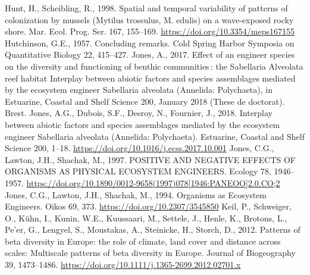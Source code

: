 \documentclass[12pt]{report}
\begin{document}
\begin{singlespacing}
\newline\newline
Hunt, H., Scheibling, R., 1998. Spatial and temporal variability of patterns of colonization by mussels (Mytilus trossulus, M. edulis) on a wave-exposed rocky shore. Mar. Ecol. Prog. Ser. 167, 155–169. \href{https://doi.org/10.3354/meps167155}{https://doi.org/10.3354/meps167155}
\newline\newline
Hutchinson, G.E., 1957. Concluding remarks. Cold Spring Harbor Symposia on Quantitative Biology 22, 415–427.
\newline\newline
Jones, A., 2017. Effect of an engineer species on the diversity and functioning of benthic communities : the Sabellaria Alveolata reef habitat Interplay between abiotic factors and species assemblages mediated by the ecosystem engineer Sabellaria alveolata (Annelida: Polychaeta), in Estuarine, Coastal and Shelf Science 200, January 2018 (These de doctorat). Brest.
\newline\newline
Jones, A.G., Dubois, S.F., Desroy, N., Fournier, J., 2018. Interplay between abiotic factors and species assemblages mediated by the ecosystem engineer Sabellaria alveolata (Annelida: Polychaeta). Estuarine, Coastal and Shelf Science 200, 1–18. \href{https://doi.org/10.1016/j.ecss.2017.10.001}{https://doi.org/10.1016/j.ecss.2017.10.001}
\newline\newline
Jones, C.G., Lawton, J.H., Shachak, M., 1997. POSITIVE AND NEGATIVE EFFECTS OF ORGANISMS AS PHYSICAL ECOSYSTEM ENGINEERS. Ecology 78, 1946–1957. \href{https://doi.org/10.1890/0012-9658(1997)078[1946:PANEOO]2.0.CO;2}{https://doi.org/10.1890/0012-9658(1997)078[1946:PANEOO]2.0.CO;2}
\newline\newline
Jones, C.G., Lawton, J.H., Shachak, M., 1994. Organisms as Ecosystem Engineers. Oikos 69, 373. \href{https://doi.org/10.2307/3545850}{https://doi.org/10.2307/3545850}
\newline\newline
Keil, P., Schweiger, O., Kühn, I., Kunin, W.E., Kuussaari, M., Settele, J., Henle, K., Brotons, L., Pe’er, G., Lengyel, S., Moustakas, A., Steinicke, H., Storch, D., 2012. Patterns of beta diversity in Europe: the role of climate, land cover and distance across scales: Multiscale patterns of beta diversity in Europe. Journal of Biogeography 39, 1473–1486. \href{https://doi.org/10.1111/j.1365-2699.2012.02701.x}{https://doi.org/10.1111/j.1365-2699.2012.02701.x}

\end{singlespacing}
\end{document}
